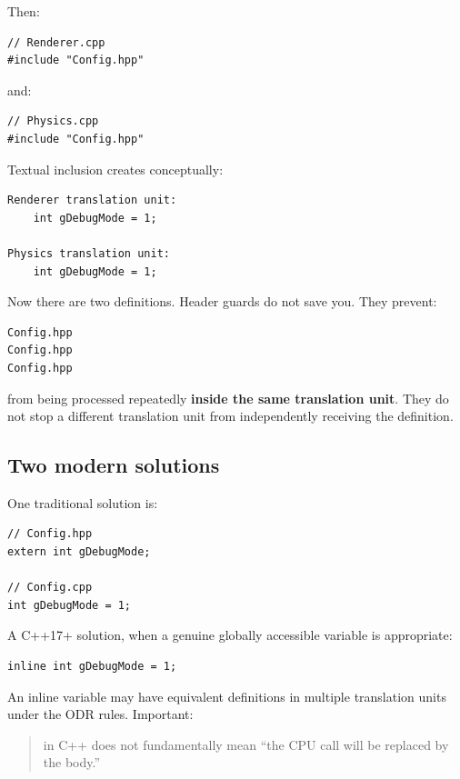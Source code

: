 Then:

\begin{verbatim}
// Renderer.cpp
#include "Config.hpp"
\end{verbatim}

and:

\begin{verbatim}
// Physics.cpp
#include "Config.hpp"
\end{verbatim}

Textual inclusion creates conceptually:

\begin{verbatim}
Renderer translation unit:
    int gDebugMode = 1;

Physics translation unit:
    int gDebugMode = 1;
\end{verbatim}

Now there are two definitions. Header guards do not save you. They prevent:

\begin{verbatim}
Config.hpp
Config.hpp
Config.hpp
\end{verbatim}

from being processed repeatedly \textbf{inside the same translation unit}. They do not stop a different translation unit from independently receiving the definition.

\subsection{Two modern solutions}\label{01-foundations-i-ch002-two-modern-solutions}

\hypertarget{01-foundations-i-ch002-two-modern-solutions}{}

One traditional solution is:

\begin{verbatim}
// Config.hpp
extern int gDebugMode;

// Config.cpp
int gDebugMode = 1;
\end{verbatim}

A C++17+ solution, when a genuine globally accessible variable is appropriate:

\begin{verbatim}
inline int gDebugMode = 1;
\end{verbatim}

An inline variable may have equivalent definitions in multiple translation units under the ODR rules. Important:

\begin{quote}
 in C++ does not fundamentally mean ``the CPU call will be replaced by the body.''
\end{quote}

